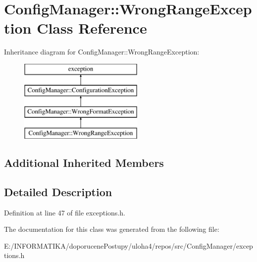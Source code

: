 \hypertarget{class_config_manager_1_1_wrong_range_exception}{}\section{Config\+Manager\+:\+:Wrong\+Range\+Exception Class Reference}
\label{class_config_manager_1_1_wrong_range_exception}
Inheritance diagram for Config\+Manager\+:\+:Wrong\+Range\+Exception\+:\begin{figure}[H]
\begin{center}
\leavevmode
\includegraphics[height=4.000000cm]{class_config_manager_1_1_wrong_range_exception}
\end{center}
\end{figure}
\subsection*{Additional Inherited Members}


\subsection{Detailed Description}


Definition at line 47 of file exceptions.\+h.



The documentation for this class was generated from the following file\+:\begin{DoxyCompactItemize}
\item 
E\+:/\+I\+N\+F\+O\+R\+M\+A\+T\+I\+K\+A/doporucene\+Postupy/uloha4/repos/src/\+Config\+Manager/exceptions.\+h\end{DoxyCompactItemize}
